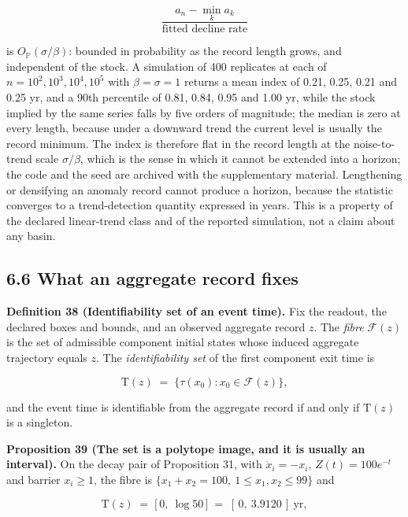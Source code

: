 \documentclass[11pt]{article}
\begin{document}
$$\frac{a_n-\min_ka_k}{\text{fitted decline rate}}$$

 is \(O_{\mathbb P}(\sigma/\beta)\): bounded in probability as the record length grows, and independent of the stock. A simulation of 400 replicates at each of \(n=10^2,10^3,10^4,10^5\) with \(\beta=\sigma=1\) returns a mean index of 0.21, 0.25, 0.21 and 0.25 yr, and a 90th percentile of 0.81, 0.84, 0.95 and 1.00 yr, while the stock implied by the same series falls by five orders of magnitude; the median is zero at every length, because under a downward trend the current level is usually the record minimum. The index is therefore flat in the record length at the noise-to-trend scale \(\sigma/\beta\), which is the sense in which it cannot be extended into a horizon; the code and the seed are archived with the supplementary material. Lengthening or densifying an anomaly record cannot produce a horizon, because the statistic converges to a trend-detection quantity expressed in years. This is a property of the declared linear-trend class and of the reported simulation, not a claim about any basin.

\vspace{0.8em}

\subsection*{6.6 What an aggregate record fixes}\label{66-what-an-aggregate-record-fixes}

\textbf{Definition 38 (Identifiability set of an event time).} Fix the readout, the declared boxes and bounds, and an observed aggregate record \(z\). The \emph{fibre} \(\mathcal F(z)\) is the set of admissible component initial states whose induced aggregate trajectory equals \(z\). The \emph{identifiability set} of the first component exit time is 

$$\mathrm T(z) \;=\; \bigl\{\tau(x_0) : x_0 \in \mathcal F(z)\bigr\},$$

 and the event time is identifiable from the aggregate record if and only if \(\mathrm T(z)\) is a singleton.

\textbf{Proposition 39 (The set is a polytope image, and it is usually an interval).} On the decay pair of Proposition 31, with \(\dot x_i = -x_i\), \(Z(t) = 100 e^{-t}\) and barrier \(x_i \ge 1\), the fibre is \(\{x_1 +\allowbreak{} x_2 =\allowbreak{} 100,\allowbreak{}\ 1 \le x_1,\allowbreak{} x_2 \le 99\}\) and 

$$\mathrm T(z) \;=\; \bigl[\,0,\ \log 50\,\bigr] \;=\; [\,0,\ 3.9120\,] \ \text{yr},$$
\end{document}
